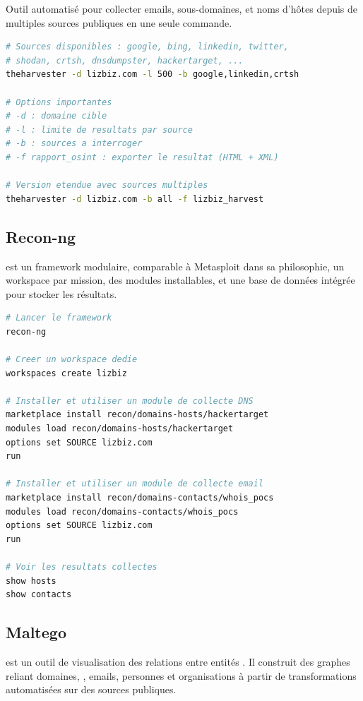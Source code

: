 Outil automatisé pour collecter emails, sous-domaines,  et noms
d'hôtes depuis de multiples sources publiques en une seule commande.

\begin{lstlisting}[language=bash, caption={Collecte multi-sources avec theHarvester}]
# Sources disponibles : google, bing, linkedin, twitter,
# shodan, crtsh, dnsdumpster, hackertarget, ...
theharvester -d lizbiz.com -l 500 -b google,linkedin,crtsh

# Options importantes
# -d : domaine cible
# -l : limite de resultats par source
# -b : sources a interroger
# -f rapport_osint : exporter le resultat (HTML + XML)

# Version etendue avec sources multiples
theharvester -d lizbiz.com -b all -f lizbiz_harvest
\end{lstlisting}

\subsection{Recon-ng}
\label{subsec:recon_ng}

 est un framework  modulaire, comparable à
Metasploit dans sa philosophie, un workspace par mission, des modules
installables, et une base de données intégrée pour stocker les résultats.

\begin{lstlisting}[language=bash, caption={Workflow Recon-ng, LiZbiZ}]
# Lancer le framework
recon-ng

# Creer un workspace dedie
workspaces create lizbiz

# Installer et utiliser un module de collecte DNS
marketplace install recon/domains-hosts/hackertarget
modules load recon/domains-hosts/hackertarget
options set SOURCE lizbiz.com
run

# Installer et utiliser un module de collecte email
marketplace install recon/domains-contacts/whois_pocs
modules load recon/domains-contacts/whois_pocs
options set SOURCE lizbiz.com
run

# Voir les resultats collectes
show hosts
show contacts
\end{lstlisting}

\subsection{Maltego}
\label{subsec:maltego}

 est un outil de visualisation des relations entre entités
. Il construit des graphes reliant domaines, , emails,
personnes et organisations à partir de transformations automatisées sur des
sources publiques.

